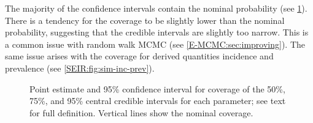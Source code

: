 \documentclass[thesis.tex]{subfiles}
\begin{document}
The majority of the confidence intervals contain the nominal probability (see \cref{SEIR:fig:sim-coverage}).
There is a tendency for the coverage to be slightly lower than the nominal probability, suggesting that the credible intervals are slightly too narrow.
This is a common issue with random walk MCMC (see \cref{E-MCMC:sec:improving}).
The same issue arises with the coverage for derived quantities incidence and prevalence (see \cref{SEIR:fig:sim-inc-prev}).
\begin{figure}
    \caption[Coverage of simulation study]{%
        Point estimate and 95\% confidence interval for coverage of the 50\%, 75\%, and 95\% central credible intervals for each parameter; see text for full definition.
        Vertical lines show the nominal coverage.
    }
    \label{SEIR:fig:sim-coverage}
\end{figure}
\end{document}
